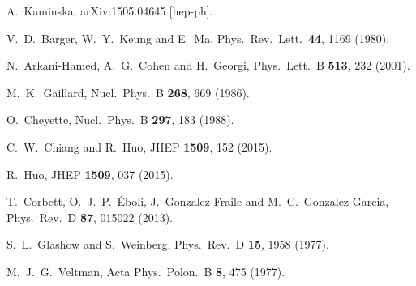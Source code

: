   A.~Kaminska,
  arXiv:1505.04645 [hep-ph].

  V.~D.~Barger, W.~Y.~Keung and E.~Ma,
  Phys.\ Rev.\ Lett.\  {\bf 44}, 1169 (1980).

  N.~Arkani-Hamed, A.~G.~Cohen and H.~Georgi,
  Phys.\ Lett.\ B {\bf 513}, 232 (2001).
  
  M.~K.~Gaillard,
  Nucl.\ Phys.\ B {\bf 268}, 669 (1986).

  O.~Cheyette,
  Nucl.\ Phys.\ B {\bf 297}, 183 (1988).

  C.~W.~Chiang and R.~Huo,
  JHEP {\bf 1509}, 152 (2015).  

  R.~Huo,
  JHEP {\bf 1509}, 037 (2015).
  
  T.~Corbett, O.~J.~P.~\'Eboli, J.~Gonzalez-Fraile and M.~C.~Gonzalez-Garcia,
  Phys.\ Rev.\ D {\bf 87}, 015022 (2013).

  S.~L.~Glashow and S.~Weinberg,
  Phys.\ Rev.\ D {\bf 15}, 1958 (1977).

  M.~J.~G.~Veltman,
  Acta Phys.\ Polon.\ B {\bf 8}, 475 (1977).
  
